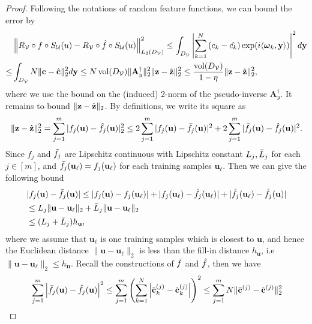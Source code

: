 \documentclass[11pt,twoside]{article}
\theoremstyle{plain}
\theoremstyle{definition}
\theoremstyle{remark}
\newcommand{\Ab}{\mathbf{A}}
\newcommand{\yb}{\mathbf{y}}
\newcommand{\cb}{\mathbf{c}}
\newcommand{\zb}{\mathbf{z}}
\newcommand{\ub}{\mathbf{u}}
\newcommand{\Uc}{\mathcal{U}}
\newcommand{\Vc}{\mathcal{V}}
\newcommand{\vol}{\mathop{\mathrm{vol}}}
\newcommand{\omegab}{\boldsymbol\omega}
\begin{document}
\begin{proof}
Following the notations of random feature functions, we can bound the error by
\begin{equation}
\label{boundI2}
\begin{aligned}
& \left\|R_\Vc\circ f\circ S_\Uc(u) - R_\Vc\circ\Hat{f}\circ S_\Uc(u)\right\|^2_{L_2(D_\Vc)} \leq \int_{D_\Vc} \left|\sum_{k=1}^N \left(c_k - \Hat{c_k}\right) \exp(i\langle \omegab_k,\yb\rangle) \right|^2 d\yb \\
\leq & \int_{D_\Vc} N \|\cb-\Hat{\cb}\|^2_2 d\yb 
\leq N\vol(D_\Vc)\|\Ab_y^\dagger\|_2^2 \|\zb-\Hat{\zb}\|_2^2 
\leq \frac{\vol(D_\Vc)}{1-\eta}\|\zb-\Hat{\zb}\|_2^2,
\end{aligned}
\end{equation}
where we use the bound on the (induced) 2-norm of the pseudo-inverse $\Ab_y^\dagger$.
It remains to bound $\|\zb-\Hat{\zb}\|_2$. By definitions, we write its square as
\begin{equation*}
\|\zb-\Hat{\zb}\|_2^2 = \sum_{j=1}^m |f_j(\ub) - \Hat{f}_j(\ub)|_2^2 \leq 2\sum_{j=1}^m |f_j(\ub) - \Bar{f}_j(\ub)|^2 + 2\sum_{j=1}^m |\Bar{f}_j(\ub) - \Hat{f}_j(\ub)|^2.
\end{equation*}
Since $f_j$ and $\Bar{f}_j$ are Lipschitz continuous with Lipschitz constant $L_j, \Bar{L}_j$ for each $j\in[m]$, and $\Bar{f}_j(\ub_\ell) = f_j(\ub_\ell)$ for each training samples $\ub_\ell$. Then we can give the following bound
\begin{equation*}
\begin{aligned}
& |f_j(\ub) - \Bar{f}_j(\ub)| \leq |f_j(\ub) - f_j(\ub_\ell)| + |f_j(\ub_\ell) - \Hat{f}_j(\ub_\ell)| + |\Hat{f}_j(\ub_\ell) - \Hat{f}_j(\ub)|   \\
& \leq L_j \|\ub-\ub_\ell\|_2 + \Bar{L}_j\|\ub-\ub_\ell\|_2 \\
& \leq  (L_j + \Bar{L}_j) h_\ub,
\end{aligned}
\end{equation*}
where we assume that $\ub_\ell$ is one training samples which is closest to $\ub$, and hence the Euclidean distance $\|\ub-\ub_\ell\|_2$ is less than the fill-in distance $h_\ub$, i.e $\|\ub-\ub_\ell\|_2 \leq h_\ub$.
Recall the constructions of $\Bar{f}$ and $\Hat{f}$, then we have
\begin{equation*}
\begin{aligned}
& \sum_{j=1}^m \left|\Bar{f}_j(\ub) - \Hat{f}_j(\ub)\right|^2 \leq \sum_{j=1}^m \left( \sum_{k=1}^N \left|\Bar{\cb}_k^{(j)} - \Hat{\cb}_k^{(j)}\right|\right)^2 \leq \sum_{j=1}^m N\|\Bar{\cb}^{(j)} - \Hat{\cb}^{(j)}\|_2^2 \\

\end{aligned}
\end{equation*}
\end{proof}
\end{document}
